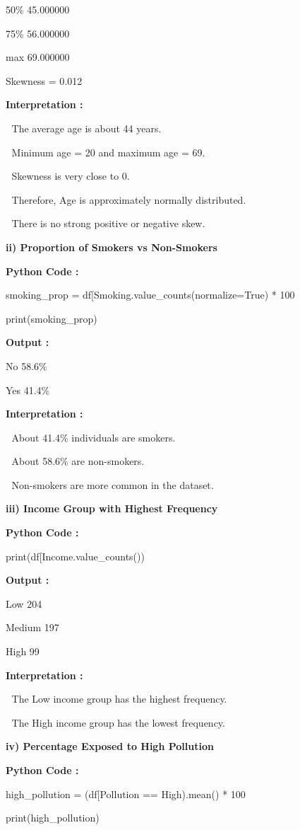 \documentclass[
]{article}
\begin{document}
50\% 45.000000

75\% 56.000000

max 69.000000

Skewness = 0.012

\textbf{Interpretation :}

 The average age is about 44 years.

 Minimum age = 20 and maximum age = 69.

 Skewness is very close to 0.

 Therefore, Age is approximately normally distributed.

 There is no strong positive or negative skew.

\textbf{ii) Proportion of Smokers vs Non-Smokers}

\textbf{Python Code :}

smoking\_prop =
df{[}\textquotesingle Smoking\textquotesingle{]}.value\_counts(normalize=True)
* 100

print(smoking\_prop)

\textbf{Output :}

No 58.6\%

Yes 41.4\%

\textbf{Interpretation :}

 About 41.4\% individuals are smokers.

 About 58.6\% are non-smokers.

 Non-smokers are more common in the dataset.

\textbf{iii) Income Group with Highest Frequency}

\textbf{Python Code :}

print(df{[}\textquotesingle Income\textquotesingle{]}.value\_counts())

\textbf{Output :}

Low 204

Medium 197

High 99

\textbf{Interpretation :}

 The Low income group has the highest frequency.

 The High income group has the lowest frequency.

\textbf{iv) Percentage Exposed to High Pollution}

\textbf{Python Code :}

high\_pollution = (df{[}\textquotesingle Pollution\textquotesingle{]} ==
\textquotesingle High\textquotesingle).mean() * 100

print(high\_pollution)
\end{document}
